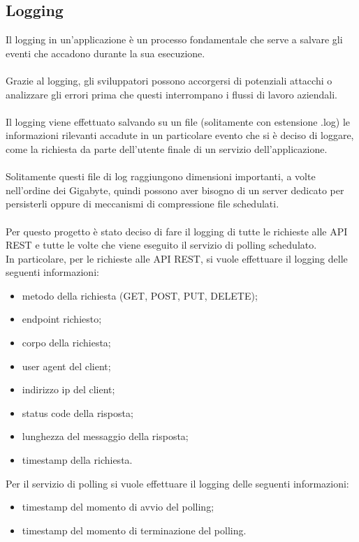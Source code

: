 \subsection{Logging}
Il logging in un'applicazione è un processo fondamentale che serve a salvare gli eventi che accadono durante
la sua esecuzione.
\\\\
Grazie al logging, gli sviluppatori possono accorgersi di potenziali attacchi o analizzare gli
errori prima che questi interrompano i flussi di lavoro aziendali.
\\\\
Il logging viene effettuato salvando su un file (solitamente con estensione .log) le informazioni rilevanti
accadute in un particolare evento che si è deciso di loggare, come la richiesta da parte
dell'utente finale di un servizio dell'applicazione.
\\\\
Solitamente questi file di log raggiungono dimensioni importanti, a volte nell'ordine dei Gigabyte, quindi possono aver bisogno di
un server dedicato per persisterli oppure di meccanismi di compressione file schedulati.
\\\\
Per questo progetto è stato deciso di fare il logging di tutte le richieste alle \gls{API} \gls{REST}
e tutte le volte che viene eseguito il servizio di polling schedulato.
\\
In particolare, per le richieste alle \gls{API} \gls{REST}, si vuole effettuare il logging delle seguenti 
informazioni:
\begin{itemize}
    \item metodo della richiesta (GET, POST, PUT, DELETE);
    \item \gls{endpoint} richiesto;
    \item corpo della richiesta;
    \item user agent del client;
    \item indirizzo ip del client;
    \item status code della risposta;
    \item lunghezza del messaggio della risposta;
    \item timestamp della richiesta.
\end{itemize}
\leavevmode\newline
Per il servizio di polling si vuole effettuare il logging delle seguenti informazioni:
\begin{itemize}
    \item timestamp del momento di avvio del polling;
    \item timestamp del momento di terminazione del polling.
\end{itemize}
